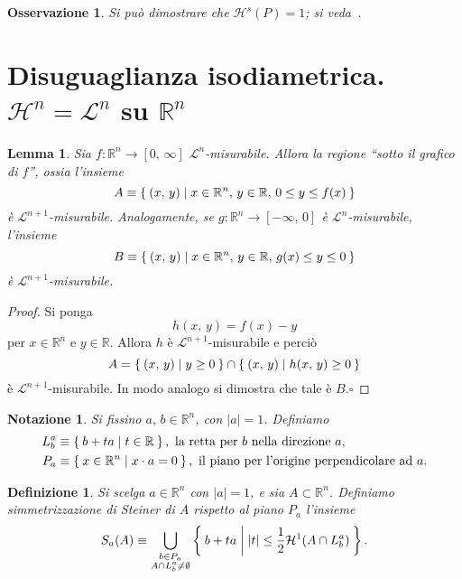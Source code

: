 \documentclass[a4paper,10pt,openright,oneside]{book}
\theoremstyle{theoremstyle}
\newtheorem{lemma}[teorema]{Lemma}
\theoremstyle{theoremstylewoheader}
\theoremstyle{theoremstyle}
\newtheorem{definizione}[teorema]{Definizione}
\newtheorem{notazione}[teorema]{Notazione}
\newtheorem{osservazione}[teorema]{Osservazione}
\theoremstyle{proofsecstyle}
\theoremstyle{nonumberplain}
\newtheorem{proof}{Dim.}
\newcommand{\RR}{\ensuremath{\mathbb{R}}}
\newcommand{\Leb}{\ensuremath{\mathcal{L}}}
\newcommand{\Haus}{\ensuremath{\mathcal{H}}}
\newcommand{\abs}[1]{\ensuremath{\lvert #1 \rvert}}
\renewcommand{\qedsymbol}{\ensuremath{\square}}
\newcommand{\qed}{\unskip\nobreak\hfill\nobreak\hspace{.5em}\qedsymbol}
\begin{document}
\begin{osservazione}
Si può dimostrare che $\Haus^s(P) = 1$; si veda~\cite[pag.~35]{falconer}.
\end{osservazione}

\section{Disuguaglianza isodiametrica. $\Haus^n = \Leb^n$ su $\RR^n$}

\begin{lemma}
\label{lem:regione_sotto_il_grafico}
Sia $f : \RR^n \rightarrow [0,\, \infty]$ $\Leb^n$-misurabile. Allora la regione ``sotto il grafico di $f$'', ossia l'insieme
\[
A \equiv \Set { (x,\, y) | x \in \RR^n,\, y \in \RR,\, 0 \le y \le f(x) }
\]
è $\Leb^{n+1}$-misurabile. Analogamente, se $g : \RR^n \rightarrow [-\infty,\, 0]$ è $\Leb^n$-misurabile, l'insieme
\[
B \equiv \Set { (x,\, y) | x \in \RR^n,\, y \in \RR,\, g(x) \le y \le 0 }
\]
è $\Leb^{n+1}$-misurabile.
\end{lemma}

\begin{proof}
Si ponga
\[
h(x,\, y) = f(x) - y
\]
per $x \in \RR^n$ e $y \in \RR$. Allora $h$ è $\Leb^{n+1}$-misurabile e perciò
\[
A = \Set{ (x,\, y) | y \ge 0 } \cap \Set{ (x,\, y) | h(x,\, y) \ge 0 }
\]
è $\Leb^{n+1}$-misurabile. In modo analogo si dimostra che tale è $B$.\qed
\end{proof}

\begin{notazione}
Si fissino $a,\, b \in \RR^n$, con $\abs{a} = 1$. Definiamo
\begin{align*}
L_b^a &\equiv \Set{ b + ta | t \in \RR}, \text{ la retta per $b$ nella direzione $a$,}\\
P_a &\equiv \Set{ x \in \RR^n | x \cdot a = 0}, \text{ il piano per l'origine perpendicolare ad $a$.}
\end{align*}
\end{notazione}

\begin{definizione}
\label{def:simmetrizzazione_steiner}
Si scelga $a \in \RR^n$ con $\abs{a} = 1$, e sia $A \subset \RR^n$. Definiamo \emph{simmetrizzazione di Steiner} di $A$ rispetto al piano $P_a$ l'insieme
\[
S_a(A) \equiv \bigcup_{\substack{b \in P_a\\A \cap L_b^a \ne \emptyset}} \Set{ b+ta | \abs{t} \le \frac{1}{2} \Haus^1(A \cap L_b^a) }.
\]
\end{definizione}
\end{document}
